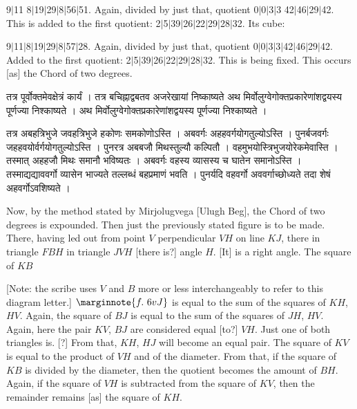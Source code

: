 \documentclass[11pt,a5paper]{book}
\def\danda{$|$}
\begin{document}
9\danda 11 8\danda 19\danda 29\danda 8\danda 56\danda 51. Again, divided by just that,
quotient 0\danda 0\danda 3\danda 3 42\danda 46\danda 29\danda 42. This is added to the first 
quotient: 2\danda 5\danda 39\danda 26\danda 22\danda 29\danda 28\danda 32. Its cube: 

9\danda 11\danda 8\danda 19\danda 29\danda 8\danda 57\danda 28. Again, divided by just that,
quotient 0\danda 0\danda 3\danda 3\danda 42\danda 46\danda 29\danda 42. 
Added to the first quotient: 2\danda 5\danda 39\danda 26\danda 22\danda 29\danda 28\danda 32.
This is being fixed. This occurs [as] the Chord of two degrees.

\newpage
{\s तत्र पूर्वोक्तमेवक्षेत्रं कार्यं । 
तत्र बचिह्नाद्वबतव अजरेखायां निष्काष्यते अथ मिर्वोलुग्वेगोक्तप्रकारेणांशद्वयस्य पूर्णज्या निश्काष्यते । 
अथ मिर्वोलुग्वेगोक्तप्रकारेणांशद्वयस्य पूर्णज्या निश्काष्यते । 


तत्र अबहत्रिभुजे जवहत्रिभुजे हकोणः समकोणोऽस्ति । अबवर्गः अहहवर्गयोगतुल्योऽस्ति । 
पुनर्बजवर्गः जहहवयोर्वर्गयोगतुल्योऽस्ति । 
पुनरत्र अबबजौ मिथस्तुल्यौ कल्पितौ । वहमुभयोस्त्रिभुजयोरेकमेवास्ति । 
तस्मात् अहहजौ मिथः समानौ भविष्यतः । अबवर्गः वहस्य व्यासस्य च घातेन समानोऽस्ति । 
तस्माद्यद्याववर्गो व्यासेन भाज्यते तल्लब्धं बहप्रमाणं भवति ।
पुनर्यदि वहवर्गो अववर्गाच्छोध्यते तदा शेषं अहवर्गोऽवशिष्यते । }
\newpage
Now, by the method stated by Mirjolugvega [Ulugh Beg], the Chord of two degrees is expounded. 
Then just the previously stated figure is to be made. \\ 

\iffalse
\begin{center}
\texttt{[image: 6r.png]}
\captionof{figure}{6r}
\end{center}
\fi 

There, having led out from point $V$ perpendicular $VH$ on line $KJ$, there in triangle
$FBH$ in triangle $JVH$ [there is?] angle $H$. [It] is a right angle. The square of $KB$ 

[Note: the scribe uses $V$ and $B$ more or less interchangeably to refer to this 
diagram letter.]
$\marginnote{f.~6v J}$
is equal to the sum of the squares of $KH$, $HV$. Again, the square of $BJ$ is equal to the
sum of the squares of $JH$, $HV$. Again, here the pair $KV$, $BJ$ are considered equal 
[to?] $VH$. Just one of both triangles is.  [?] From that, $KH$, $HJ$ will become an equal pair.
The square of $KV$ is equal to the product of $VH$ and of the diameter. From that, if the 
square of $KB$ is divided by the diameter, then the quotient becomes the amount of $BH$.
Again, if the square of $VH$ is subtracted from the square of $KV$, then the remainder
remains [as] the square of $KH$.  
\end{document}
